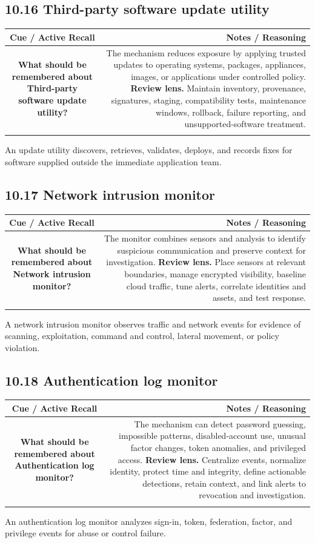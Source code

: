 \documentclass[11pt]{article}
\newcommand{\CornellHeader}{\rowcolor{Navy}\color{white}\bfseries Cue / Active Recall & \color{white}\bfseries Notes / Reasoning \\\endhead}
\newcommand{\CornellRow}[2]{\cellcolor{CueGray}\textbf{#1} & #2 \\\addlinespace[3pt]}
\begin{document}
\subsection{10.16 Third-party software update utility}
\begin{longtable}{@{}C N@{}}
\CornellHeader
\CornellRow{What should be remembered about Third-party software update utility?}{The mechanism reduces exposure by applying trusted updates to operating systems, packages, appliances, images, or applications under controlled policy. \textbf{Review lens.} Maintain inventory, provenance, signatures, staging, compatibility tests, maintenance windows, rollback, failure reporting, and unsupported-software treatment.}
\end{longtable}
\begin{sectionsummarybox}
An update utility discovers, retrieves, validates, deploys, and records fixes for software supplied outside the immediate application team.
\end{sectionsummarybox}
\subsection{10.17 Network intrusion monitor}
\begin{longtable}{@{}C N@{}}
\CornellHeader
\CornellRow{What should be remembered about Network intrusion monitor?}{The monitor combines sensors and analysis to identify suspicious communication and preserve context for investigation. \textbf{Review lens.} Place sensors at relevant boundaries, manage encrypted visibility, baseline cloud traffic, tune alerts, correlate identities and assets, and test response.}
\end{longtable}
\begin{sectionsummarybox}
A network intrusion monitor observes traffic and network events for evidence of scanning, exploitation, command and control, lateral movement, or policy violation.
\end{sectionsummarybox}
\subsection{10.18 Authentication log monitor}
\begin{longtable}{@{}C N@{}}
\CornellHeader
\CornellRow{What should be remembered about Authentication log monitor?}{The mechanism can detect password guessing, impossible patterns, disabled-account use, unusual factor changes, token anomalies, and privileged access. \textbf{Review lens.} Centralize events, normalize identity, protect time and integrity, define actionable detections, retain context, and link alerts to revocation and investigation.}
\end{longtable}
\begin{sectionsummarybox}
An authentication log monitor analyzes sign-in, token, federation, factor, and privilege events for abuse or control failure.
\end{sectionsummarybox}
\end{document}
